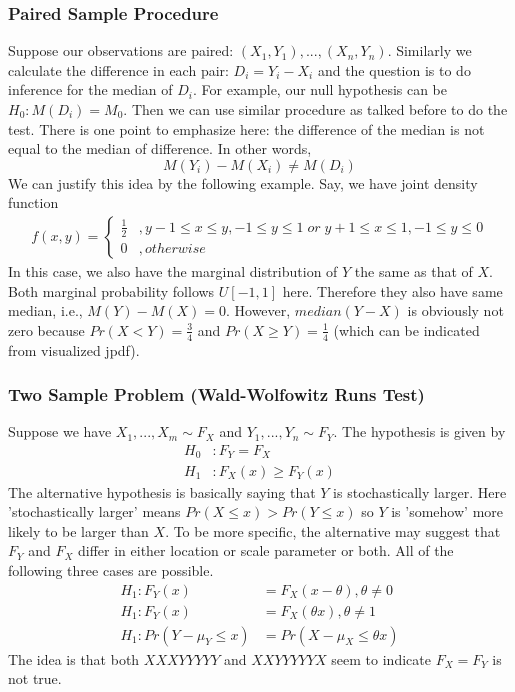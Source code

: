 \documentclass[twoside]{article}
\begin{document}
\subsubsection{Paired Sample Procedure}
Suppose our observations are paired: $(X_1, Y_1), ..., (X_n, Y_n)$. Similarly we calculate the difference in each pair: $D_i = Y_i - X_i$ and the question is to do inference for the median of $D_i$. For example, our null hypothesis can be $H_0: M(D_i) = M_0$. Then we can use similar procedure as talked before to do the test. There is one point to emphasize here: the difference of the median is not equal to the median of difference. In other words, 
$$
M(Y_i) - M(X_i) \neq M(D_i)
$$
We can justify this idea by the following example. Say, we have joint density function
\begin{align*}
	f(x,y) = \begin{cases}
		\frac{1}{2} &, y-1 \leqslant x \leqslant y, -1 \leqslant y \leqslant 1 \; or \; y+1 \leqslant x \leqslant 1, -1 \leqslant y \leqslant 0 \\
		0 &, otherwise
	\end{cases}
\end{align*}
In this case, we also have the marginal distribution of $Y$ the same as that of $X$. Both marginal probability follows $U \left[ -1, 1 \right]$ here. Therefore they also have same median, i.e., $M(Y) - M(X) = 0$. However, $median(Y-X)$ is obviously not zero because $Pr \left( X < Y \right) = \frac{3}{4}$ and $Pr \left( X \geqslant Y \right) = \frac{1}{4}$ (which can be indicated from visualized jpdf).

\subsubsection{Two Sample Problem (Wald-Wolfowitz Runs Test)}
Suppose we have $X_1, ..., X_m \sim F_X$ and $Y_1, ..., Y_n \sim F_Y$. The hypothesis is given by
\begin{align*}
	H_0&: F_Y = F_X \\
	H_1&: F_X(x) \geqslant F_Y(x)
\end{align*}
The alternative hypothesis is basically saying that $Y$ is stochastically larger. Here 'stochastically larger' means $Pr \left( X \leqslant x \right) > Pr \left( Y \leqslant x \right)$ so $Y$ is 'somehow' more likely to be larger than $X$. To be more specific, the alternative may suggest that $F_Y$ and $F_X$ differ in either location or scale parameter or both. All of the following three cases are possible. 
\begin{align*}
	H_1: F_Y(x) &= F_X(x - \theta), \theta \neq 0 \\
	H_1: F_Y(x) &= F_X (\theta x), \theta \neq 1 \\
	H_1: Pr \left( Y - \mu_Y \leqslant x \right) &= Pr \left( X - \mu_X \leqslant \theta x \right)
\end{align*}
The idea is that both $XXXYYYYY$ and $XXYYYYYX$ seem to indicate $F_X = F_Y$ is not true. 
\end{document}
